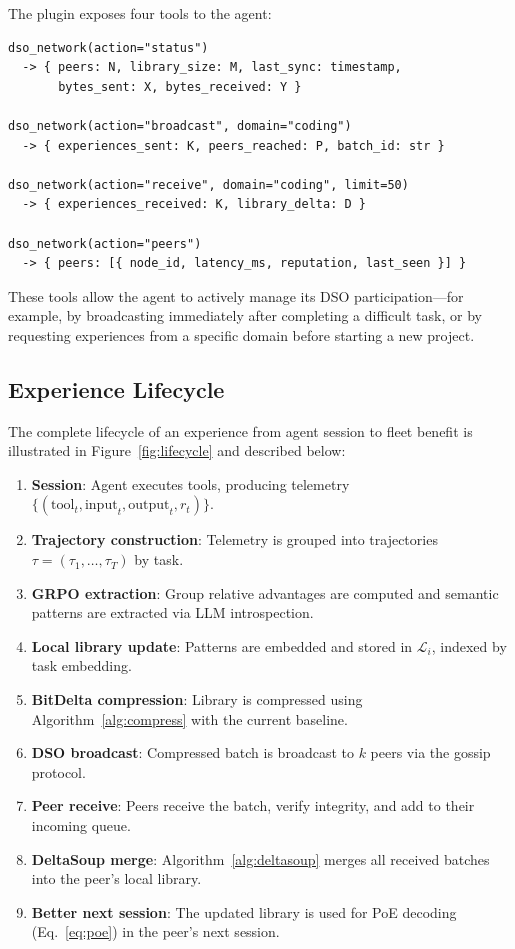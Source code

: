 \documentclass[11pt]{article}
\begin{document}
The plugin exposes four tools to the agent:

\begin{verbatim}
dso_network(action="status")
  -> { peers: N, library_size: M, last_sync: timestamp,
       bytes_sent: X, bytes_received: Y }

dso_network(action="broadcast", domain="coding")
  -> { experiences_sent: K, peers_reached: P, batch_id: str }

dso_network(action="receive", domain="coding", limit=50)
  -> { experiences_received: K, library_delta: D }

dso_network(action="peers")
  -> { peers: [{ node_id, latency_ms, reputation, last_seen }] }
\end{verbatim}

These tools allow the agent to actively manage its DSO participation---for
example, by broadcasting immediately after completing a difficult task, or
by requesting experiences from a specific domain before starting a new
project.

\subsection{Experience Lifecycle}

The complete lifecycle of an experience from agent session to fleet benefit
is illustrated in Figure~\ref{fig:lifecycle} and described below:

\begin{enumerate}[leftmargin=1.5em]
    \item \textbf{Session}: Agent executes tools, producing telemetry
          $\{(\text{tool}_t, \text{input}_t, \text{output}_t, r_t)\}$.
    \item \textbf{Trajectory construction}: Telemetry is grouped into
          trajectories $\tau = (\tau_1, \ldots, \tau_T)$ by task.
    \item \textbf{GRPO extraction}: Group relative advantages are computed
          and semantic patterns are extracted via LLM introspection.
    \item \textbf{Local library update}: Patterns are embedded and stored
          in $\mathcal{L}_i$, indexed by task embedding.
    \item \textbf{BitDelta compression}: Library is compressed using
          Algorithm~\ref{alg:compress} with the current baseline.
    \item \textbf{DSO broadcast}: Compressed batch is broadcast to $k$
          peers via the gossip protocol.
    \item \textbf{Peer receive}: Peers receive the batch, verify integrity,
          and add to their incoming queue.
    \item \textbf{DeltaSoup merge}: Algorithm~\ref{alg:deltasoup} merges
          all received batches into the peer's local library.
    \item \textbf{Better next session}: The updated library is used for
          PoE decoding (Eq.~\ref{eq:poe}) in the peer's next session.
\end{enumerate}
\end{document}
